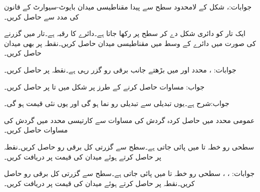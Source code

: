 جوابات:، 
شکل  کے لامحدود سطح سے پیدا مقناطیسی میدان بایوٹ-سیوارٹ کے قانون کی مدد سے حاصل کریں۔

ایک تار کو دائری شکل دے کر سطح  پر رکھا جاتا ہے۔دائرے کا رقبہ  ہے۔تار میں  گزرنے کی صورت میں دائرے کے وسط  میں مقناطیسی میدان  حاصل کریں۔نقطہ  پر بھی میدان حاصل کریں۔

جوابات: ، 
محدد  اور  میں بڑھتے جانب  برقی رو گزر رہی ہے۔نقطہ  پر  حاصل کریں۔

جواب:
مساوات  حاصل کرنے کے طرز پر شکل  میں  تا  پر  حاصل کریں۔

جواب:شرح  ہے۔یوں  تبدیلی سے   تبدیلی رو نما ہو گی اور یوں نئی قیمت 
{} ہو گی۔

عمومی محدد میں حاصل کردہ گردش کی مساوات سے کارتیسی محدد میں گردش کی مساوات حاصل کریں۔

سطحی رو  خطہ  تا  میں پائی جاتی ہے۔سطح  سے گزرتی کل برقی رو حاصل کریں۔نقطہ  پر  حاصل کرتے ہوئے میدان کی قیمت  پر دریافت کریں۔

جوابات: ، ، 
سطحی رو  خطہ  تا  میں پائی جاتی ہے۔سطح  سے گزرتی کل برقی رو حاصل کریں۔نقطہ  پر  حاصل کرتے ہوئے میدان کی قیمت  پر دریافت کریں۔

